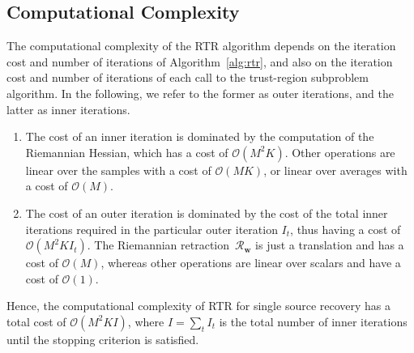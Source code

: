 

\subsection{Computational Complexity}
The computational complexity of the RTR algorithm depends on the iteration cost and number of iterations of Algorithm~\ref{alg:rtr}, and also on the iteration cost and number of iterations of each call to the trust-region subproblem algorithm. In the following, we refer to the former as outer iterations, and the latter as inner iterations. 
\begin{enumerate}
	\item The cost of an inner iteration is dominated by the computation of the Riemannian Hessian, which has a cost of $\mathcal{O}(M^2K)$. Other operations are linear over the samples with a cost of $\mathcal{O}(MK)$, or linear over averages with a cost of $\mathcal{O}(M)$.
	\item The cost of an outer iteration is dominated by the cost of the total inner iterations required in the particular outer iteration $I_t$, thus having a cost of $\mathcal{O}(M^2KI_t)$. The Riemannian retraction~$\mathcal{R}_{\bm{w}}$ is just a translation and has a cost of $\mathcal{O}(M)$, whereas other operations are linear over scalars and have a cost of $\mathcal{O}(1)$.
\end{enumerate}
Hence, the computational complexity of RTR for single source recovery has a total cost of $\mathcal{O}(M^2KI)$, where $I=\sum_{t}I_t$ is the total number of inner iterations until the stopping criterion is satisfied.

